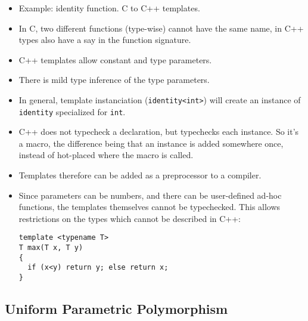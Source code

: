 \begin{itemize}

\item Example: identity function. C to C++ templates.

\item In C, two different functions (type-wise) cannot have the same name, in
C++ types also have a say in the function signature.

\item C++ templates allow constant and type parameters.

\item There is mild type inference of the type parameters.

\item In general, template instanciation (\texttt{identity<int>}) will create
an instance of \texttt{identity} specialized for \texttt{int}.

\item C++ does not typecheck a declaration, but typechecks each instance. So
it's a macro, the difference being that an instance is added somewhere once,
instead of hot-placed where the macro is called.

\item Templates therefore can be added as a preprocessor to a compiler. 

\item Since parameters can be numbers, and there can be user-defined ad-hoc
functions, the templates themselves cannot be typechecked. This allows
restrictions on the types which cannot be described in C++:

\begin{verbatim}
template <typename T>
T max(T x, T y)
{
  if (x<y) return y; else return x;
}
\end{verbatim}

\end{itemize}

\subsection{Uniform Parametric Polymorphism}

